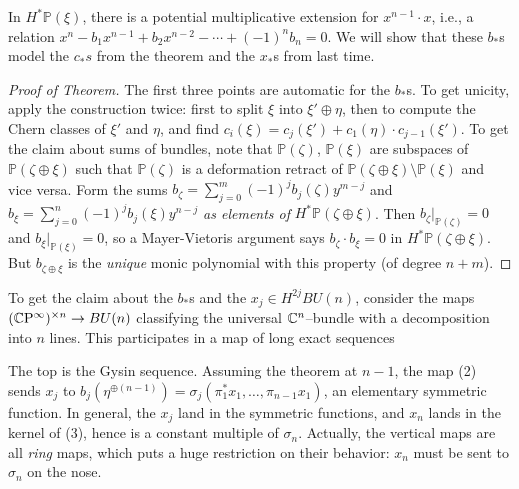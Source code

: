 \begin{subappendices}
\begin{remark}
In $H^* \mathbb P(\xi)$, there is a potential multiplicative extension for $x^{n-1} \cdot x$, i.e., a relation $x^n - b_1 x^{n-1} + b_2 x^{n-2} - \cdots + (-1)^n b_n = 0$.  We will show that these $b_*$s model the $c_*s$ from the theorem and the $x_*$s from last time.
\end{remark}

\begin{proof}[Proof of Theorem]
The first three points are automatic for the $b_*$s.  To get unicity, apply the construction twice: first to split $\xi$ into $\xi' \oplus \eta$, then to compute the Chern classes of $\xi'$ and $\eta$, and find $c_i(\xi) = c_j(\xi') + c_1(\eta) \cdot c_{j-1}(\xi')$.  To get the claim about sums of bundles, note that $\mathbb P(\zeta)$, $\mathbb P(\xi)$ are subspaces of $\mathbb P(\zeta \oplus \xi)$ such that $\mathbb P(\zeta)$ is a deformation retract of $\mathbb P(\zeta \oplus \xi) \setminus \mathbb P(\xi)$ and vice versa.  Form the sums $b_\zeta = \sum_{j=0}^m (-1)^j b_j(\zeta) y^{m-j}$ and $b_\xi = \sum_{j=0}^n (-1)^j b_j(\xi) y^{n-j}$ \emph{as elements of} $H^* \mathbb P(\zeta \oplus \xi)$.  Then $b_\zeta|_{\mathbb P(\zeta)} = 0$ and $b_\xi|_{\mathbb P(\xi)} = 0$, so a Mayer-Vietoris argument says $b_\zeta \cdot b_\xi = 0$ in $H^* \mathbb P(\zeta \oplus \xi)$.  But $b_{\zeta \oplus \xi}$ is the \emph{unique} monic polynomial with this property (of degree $n + m$).
\end{proof}

To get the claim about the $b_*$s and the $x_j \in H^{2j} BU(n)$, consider the maps $(\mathbb C \mathrm{P}^\infty)^{\times n} \to BU(n)$ classifying the universal $\mathbb C^n$--bundle with a decomposition into $n$ lines.  This participates in a map of long exact sequences
\begin{center}
\end{center}
The top is the Gysin sequence.  Assuming the theorem at $n - 1$, the map (2) sends $x_j$ to $b_j(\eta^{\oplus(n-1)}) = \sigma_j(\pi_1^* x_1, \ldots, \pi_{n-1} x_1)$, an elementary symmetric function.  In general, the $x_j$ land in the symmetric functions, and $x_n$ lands in the kernel of (3), hence is a constant multiple of $\sigma_n$.  Actually, the vertical maps are all \emph{ring} maps, which puts a huge restriction on their behavior: $x_n$ must be sent to $\sigma_n$ on the nose.

\end{subappendices}
